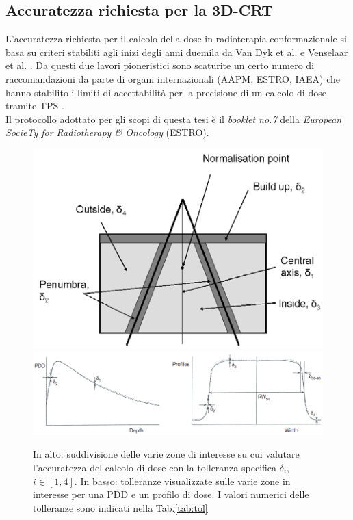 \subsection{Accuratezza richiesta per la 3D-CRT}
L'accuratezza richiesta per il calcolo della dose in radioterapia conformazionale si basa su criteri stabiliti agli inizi degli anni duemila da Van Dyk et al. e Venselaar et al. \cite{Dyk1993,Venselaar2001}. Da questi due lavori pioneristici sono scaturite un certo numero di raccomandazioni da parte di organi internazionali (AAPM, ESTRO, IAEA) che hanno stabilito i limiti di accettabilità per la precisione di un calcolo di dose tramite TPS \cite{Fraass1998,Mijnheer2004,IAEA430}.\\
Il protocollo adottato per gli scopi di questa tesi è il \textit{booklet no.7} della \textit{European SocieTy for Radiotherapy \& Oncology} (ESTRO). 
\begin{figure}[!t]
\centering
\includegraphics[width=.65\textwidth]{./cap2/Accuracy_zones.png}\\\vspace{.3cm}
\includegraphics[width=\textwidth]{./cap2/Accuracy_pdd_prof.png}
\caption{In alto: suddivisione delle varie zone di interesse su cui valutare l'accuratezza del calcolo di dose con la tolleranza specifica $\delta_i$, $i\in[1,4]$. In basso: tolleranze visualizzate sulle varie zone in interesse per una PDD e un profilo di dose. I valori numerici delle tolleranze sono indicati nella Tab.\ref{tab:tol}}
\label{fig:accuracy_zones}
\end{figure}

